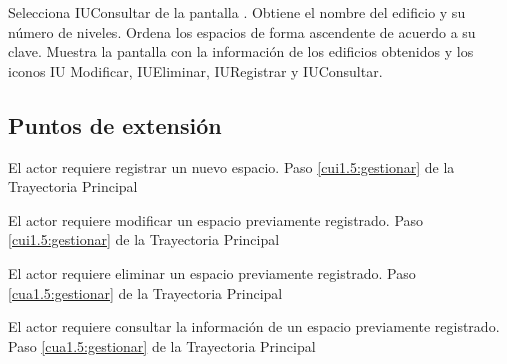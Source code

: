 \begin{UCtrayectoria}
	
	\UCpaso [\UCactor] Selecciona IUConsultar de la pantalla . %
	\UCpaso [\UCsist] Obtiene el nombre del edificio y su número de niveles.
	\UCpaso [\UCsist] Ordena los espacios de forma ascendente de acuerdo a su clave.
	\UCpaso[\UCsist] Muestra la pantalla  con la información de los edificios obtenidos y los iconos IU Modificar, IUEliminar, IURegistrar y IUConsultar. 
	\label{cui1.5:gestionar}
\end{UCtrayectoria}

\subsection{Puntos de extensión}

\UCExtensionPoint 
{El actor requiere registrar un nuevo espacio.}
{Paso \ref{cui1.5:gestionar} de la Trayectoria Principal}
{}

\UCExtensionPoint 
{El actor requiere modificar un espacio previamente registrado.}
{Paso \ref{cui1.5:gestionar} de la Trayectoria Principal}
{}

\UCExtensionPoint 
{El actor requiere eliminar un espacio previamente registrado.}
{Paso \ref{cua1.5:gestionar} de la Trayectoria Principal}
{}

\UCExtensionPoint 
{El actor requiere consultar la información de un espacio previamente registrado.}
{Paso \ref{cua1.5:gestionar} de la Trayectoria Principal}
{}


